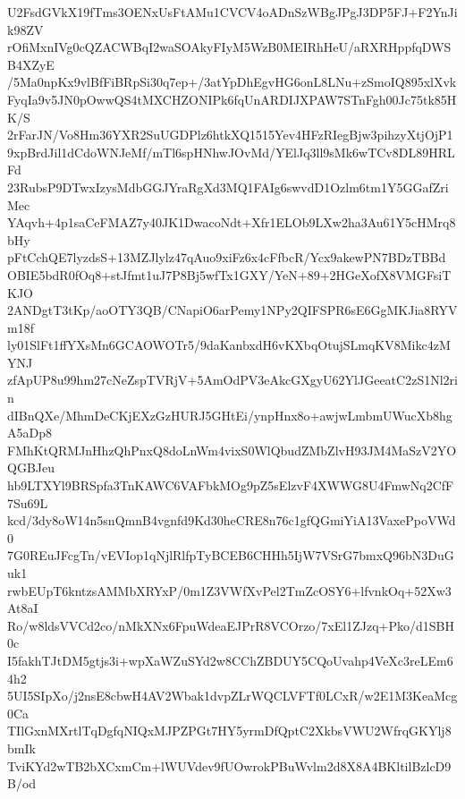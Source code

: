 U2FsdGVkX19fTms3OENxUsFtAMu1CVCV4oADnSzWBgJPgJ3DP5FJ+F2YnJik98ZV
rOfiMxnIVg0cQZACWBqI2waSOAkyFIyM5WzB0MEIRhHeU/aRXRHppfqDWSB4XZyE
/5Ma0npKx9vlBfFiBRpSi30q7ep+/3atYpDhEgvHG6onL8LNu+zSmoIQ895xlXvk
FyqIa9v5JN0pOwwQS4tMXCHZONIPk6fqUnARDIJXPAW7STnFgh00Jc75tk85HK/S
2rFarJN/Vo8Hm36YXR2SuUGDPlz6htkXQ1515Yev4HFzRIegBjw3pihzyXtjOjP1
9xpBrdJil1dCdoWNJeMf/mTl6spHNhwJOvMd/YElJq3ll9sMk6wTCv8DL89HRLFd
23RubsP9DTwxIzysMdbGGJYraRgXd3MQ1FAIg6swvdD1Ozlm6tm1Y5GGafZriMec
YAqvh+4p1saCeFMAZ7y40JK1DwacoNdt+Xfr1ELOb9LXw2ha3Au61Y5cHMrq8bHy
pFtCchQE7lyzdsS+13MZJlylz47qAuo9xiFz6x4cFfbcR/Ycx9akewPN7BDzTBBd
OBIE5bdR0fOq8+stJfmt1uJ7P8Bj5wfTx1GXY/YeN+89+2HGeXofX8VMGFsiTKJO
2ANDgtT3tKp/aoOTY3QB/CNapiO6arPemy1NPy2QIFSPR6sE6GgMKJia8RYVm18f
ly01SlFt1ffYXsMn6GCAOWOTr5/9daKanbxdH6vKXbqOtujSLmqKV8Mikc4zMYNJ
zfApUP8u99hm27cNeZspTVRjV+5AmOdPV3eAkcGXgyU62YlJGeeatC2zS1Nl2rin
dIBnQXe/MhmDeCKjEXzGzHURJ5GHtEi/ynpHnx8o+awjwLmbmUWucXb8hgA5aDp8
FMhKtQRMJnHhzQhPnxQ8doLnWm4vixS0WlQbudZMbZlvH93JM4MaSzV2YOQGBJeu
hb9LTXYl9BRSpfa3TnKAWC6VAFbkMOg9pZ5sElzvF4XWWG8U4FmwNq2CfF7Su69L
kcd/3dy8oW14n5snQmnB4vgnfd9Kd30heCRE8n76c1gfQGmiYiA13VaxePpoVWd0
7G0REuJFcgTn/vEVIop1qNjlRlfpTyBCEB6CHHh5IjW7VSrG7bmxQ96bN3DuGuk1
rwbEUpT6kntzsAMMbXRYxP/0m1Z3VWfXvPel2TmZcOSY6+lfvnkOq+52Xw3At8aI
Ro/w8ldsVVCd2co/nMkXNx6FpuWdeaEJPrR8VCOrzo/7xEl1ZJzq+Pko/d1SBH0c
I5fakhTJtDM5gtjs3i+wpXaWZuSYd2w8CChZBDUY5CQoUvahp4VeXc3reLEm64h2
5UI5SIpXo/j2nsE8cbwH4AV2Wbak1dvpZLrWQCLVFTf0LCxR/w2E1M3KeaMcg0Ca
TIlGxnMXrtlTqDgfqNIQxMJPZPGt7HY5yrmDfQptC2XkbsVWU2WfrqGKYlj8bmIk
TviKYd2wTB2bXCxmCm+lWUVdev9fUOwrokPBuWvlm2d8X8A4BKltilBzlcD9B/od
